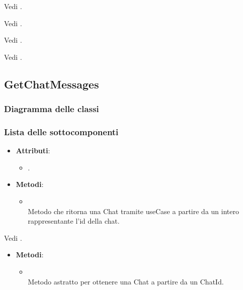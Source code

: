 \documentclass[10pt, a4paper]{article}
\begin{document}
Vedi .

Vedi .

Vedi .

Vedi .

\subsection{GetChatMessages}
\subsubsection{Diagramma delle classi}
\subsubsection{Lista delle sottocomponenti}

\label{GetChatMessagesControllerDettaglio}
\begin{itemize}
    \item \textbf{Attributi}:
    \begin{itemize}
        \item {}.
    \end{itemize}
    \item \textbf{Metodi}:
    \begin{itemize}
        \item {}\\
        Metodo che ritorna una Chat tramite useCase a partire da un intero rappresentante l'id della chat. 
    \end{itemize}
\end{itemize}

Vedi .

\label{GetChatMessagesUseCaseDettaglio}
\begin{itemize}
    \item \textbf{Metodi}:
    \begin{itemize}
        \item {}\\
        Metodo astratto per ottenere una Chat a partire da un ChatId.
    \end{itemize}
\end{itemize}
\end{document}
